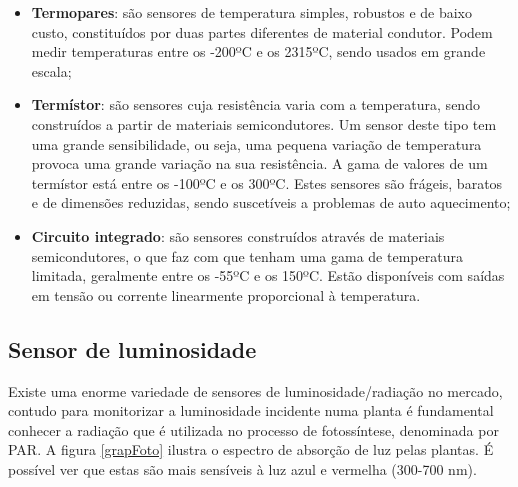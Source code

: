 \begin{itemize}
	\item \textbf{Termopares}: são sensores de temperatura simples, robustos e de baixo custo, constituídos por duas partes diferentes de material condutor. Podem medir temperaturas entre os -200ºC e os 2315ºC, sendo usados em grande escala\cite{REOTEMPInstrumentCorporation}; 
	 
	
	\item \textbf{Termístor}: são sensores cuja resistência varia com a temperatura, sendo construídos a partir de materiais semicondutores. Um sensor deste tipo tem uma grande sensibilidade, ou seja, uma pequena variação de temperatura provoca uma grande variação na sua resistência. A gama de valores de um termístor está entre os -100ºC e os 300ºC. Estes sensores são frágeis, baratos e de dimensões reduzidas, sendo suscetíveis a problemas de auto aquecimento\cite{TemperatureSensors};
	

	\item \textbf{Circuito integrado}: são sensores construídos através de materiais semicondutores, o que faz com que tenham uma gama de temperatura limitada, geralmente entre os -55ºC e os 150ºC. 	Estão disponíveis com saídas em tensão ou corrente linearmente proporcional à temperatura. 


\end{itemize}





\subsection{Sensor de luminosidade }




Existe uma enorme variedade de sensores de luminosidade/radiação no mercado, contudo para monitorizar a luminosidade incidente numa planta é fundamental conhecer a radiação que é utilizada no processo de fotossíntese, denominada por \ac{PAR}. A figura \ref{grapFoto} ilustra o espectro de absorção de luz pelas plantas. É possível ver que estas são mais sensíveis à luz azul e vermelha (300-700 nm).





